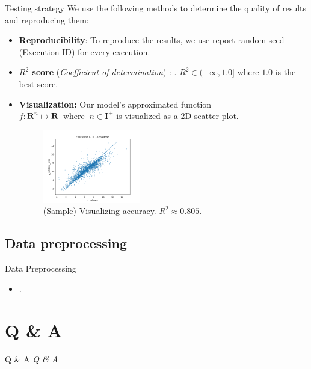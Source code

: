 \documentclass{beamer}
\begin{document}
\begin{frame}[t]{Testing strategy}
We use the following methods to determine the quality of results and reproducing them:
\begin{itemize}
\item \textbf{Reproducibility}: To reproduce the results, we use report random seed (Execution ID) for every execution. 
\item \textbf{$R^2$ score} (\textit{Coefficient of determination}) \cite{r_squared_score}: . $R^2  \in (- \infty, 1.0]$ where $1.0$ is the best score. 
\item \textbf{Visualization:}
Our model's approximated function $ f : \mathbf{R}^n \mapsto \mathbf{R} \;\; \textrm{where} \;\; n \in \mathbf{I}^+$ is visualized as a 2D scatter plot.

\begin{figure}[htb]
  \centering
    \includegraphics[width=0.40\textwidth]{images/accuracy_validate}
    \caption{(Sample) Visualizing accuracy.  $R^2 \approx 0.805$.}
    \label{fig:modelQualityVisualization}
\end{figure}

\end{itemize} 
\end{frame}

\subsection{Data preprocessing}

\begin{frame}[t]{Data Preprocessing}
\begin{itemize}
\item .
\end{itemize} 
\end{frame}

\section{Q \& A}

\begin{frame}[t]{Q \& A}
  \centering \Huge
  \emph{Q \& A}
\end{frame}
\end{document}

